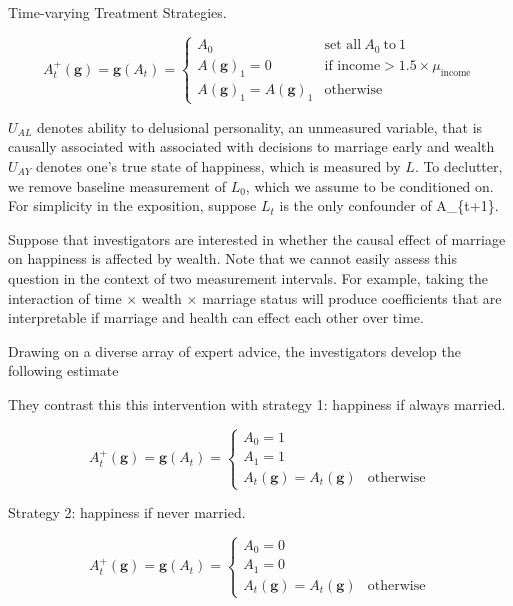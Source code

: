 \documentclass[
  single column]{article}
\makeatletter
\let\oldparagraph\paragraph
\renewcommand{\paragraph}{
    \@ifstar
      \xxxParagraphStar
      \xxxParagraphNoStar
  }
\newcommand{\xxxParagraphStar}[1]{\oldparagraph*{#1}\mbox{}}
\newcommand{\xxxParagraphNoStar}[1]{\oldparagraph{#1}\mbox{}}
\makeatother
\begin{document}
\paragraph{Time-varying Treatment
Strategies.}\label{time-varying-treatment-strategies.}

\[
A_t^{+}(\mathbf{g}) = \mathbf{g}(A_{t}) = \begin{cases} 
   A_{0}  & \text{set all} ~ A_{0} ~ \text{to} ~ 1 \\
   A(\mathbf{g})_{1} = 0 & \text{if income} > 1.5 \times  \mu_{\text{income}} \\ 
   A(\mathbf{g})_{1} =  A(\mathbf{g})_{1}& \text{otherwise} 
   \end{cases}
\]

\(U_{AL}\) denotes ability to delusional personality, an unmeasured
variable, that is causally associated with associated with decisions to
marriage early and wealth \(U_{AY}\) denotes one's true state of
happiness, which is measured by \(L\). To declutter, we remove baseline
measurement of \(L_0\), which we assume to be conditioned on. For
simplicity in the exposition, suppose \(L_t\) is the only confounder of
A\_\{t+1\}.

Suppose that investigators are interested in whether the causal effect
of marriage on happiness is affected by wealth. Note that we cannot
easily assess this question in the context of two measurement intervals.
For example, taking the interaction of time \(\times\) wealth \(\times\)
marriage status will produce coefficients that are interpretable if
marriage and health can effect each other over time.

Drawing on a diverse array of expert advice, the investigators develop
the following estimate

They contrast this this intervention with strategy 1: happiness if
always married.

\[
A_t^{+}(\mathbf{g}) = \mathbf{g}(A_{t}) = \begin{cases} 
   A_{0} = 1 & \\ 
   A_{1} = 1 & \\ 
   A_{t}(\mathbf{g}) = A_{t}(\mathbf{g}) & \text{otherwise} 
   \end{cases}
\]

Strategy 2: happiness if never married.

\[
A_t^{+}(\mathbf{g}) = \mathbf{g}(A_{t}) = \begin{cases} 
   A_{0} = 0 & \\ 
   A_{1} = 0 & \\ 
   A_{t}(\mathbf{g}) = A_{t}(\mathbf{g}) & \text{otherwise} 
   \end{cases}
\]
\end{document}
